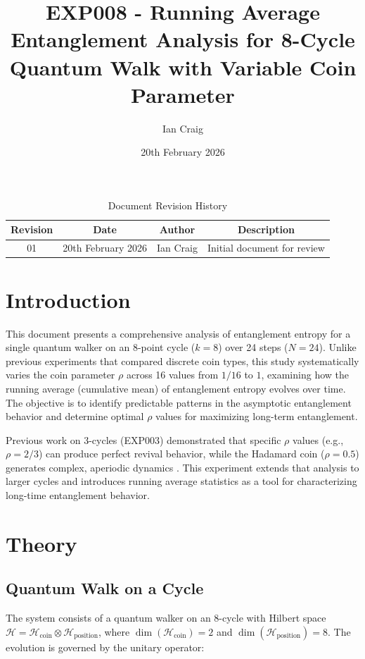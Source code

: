 \documentclass[11pt,a4paper]{article}
\title{EXP008 - Running Average Entanglement Analysis for 8-Cycle Quantum Walk with Variable Coin Parameter}
\author{Ian Craig}
\date{20th February 2026}
\begin{document}
\maketitle

\begin{table}[h]
\centering
\begin{tabular}{|c|c|c|c|}
\hline
Revision & Date & Author & Description \\
\hline
01 & 20th February 2026 & Ian Craig & Initial document for review \\
\hline
\end{tabular}
\caption{Document Revision History}
\end{table}

\section{Introduction}

This document presents a comprehensive analysis of entanglement entropy for a single quantum walker on an 8-point cycle ($k=8$) over 24 steps ($N=24$). Unlike previous experiments that compared discrete coin types, this study systematically varies the coin parameter $\rho$ across 16 values from $1/16$ to $1$, examining how the running average (cumulative mean) of entanglement entropy evolves over time. The objective is to identify predictable patterns in the asymptotic entanglement behavior and determine optimal $\rho$ values for maximizing long-term entanglement.

Previous work on 3-cycles (EXP003) demonstrated that specific $\rho$ values (e.g., $\rho = 2/3$) can produce perfect revival behavior, while the Hadamard coin ($\rho = 0.5$) generates complex, aperiodic dynamics \citep{romanielli2015, bose2024}. This experiment extends that analysis to larger cycles and introduces running average statistics as a tool for characterizing long-time entanglement behavior.

\section{Theory}

\subsection{Quantum Walk on a Cycle}

The system consists of a quantum walker on an 8-cycle with Hilbert space $\mathcal{H} = \mathcal{H}_{\mathrm{coin}} \otimes \mathcal{H}_{\mathrm{position}}$, where $\dim(\mathcal{H}_{\mathrm{coin}}) = 2$ and $\dim(\mathcal{H}_{\mathrm{position}}) = 8$. The evolution is governed by the unitary operator:
\end{document}
